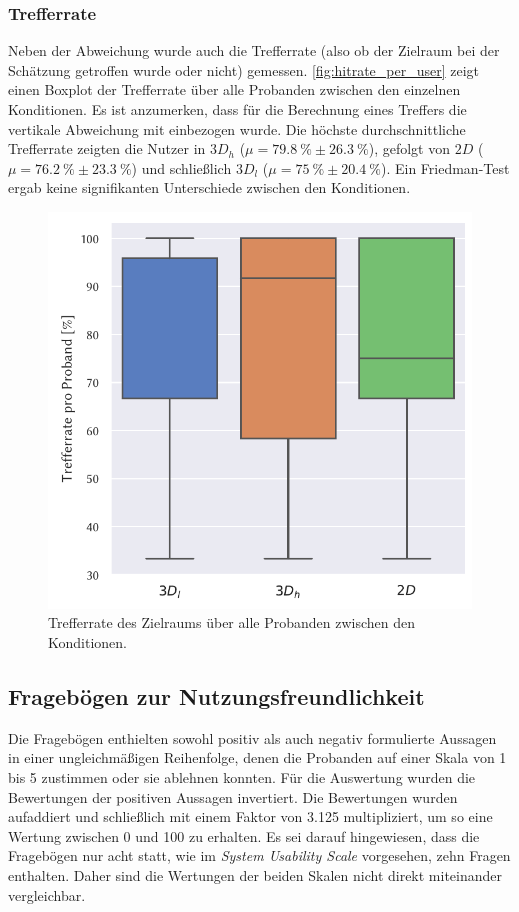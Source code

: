 \subsubsection*{Trefferrate}
Neben der Abweichung wurde auch die Trefferrate (also ob der Zielraum bei der Schätzung getroffen wurde oder nicht) gemessen.
\autoref{fig:hitrate_per_user} zeigt einen Boxplot der Trefferrate über alle Probanden zwischen den einzelnen Konditionen.
Es ist anzumerken, dass für die Berechnung eines Treffers die vertikale Abweichung mit einbezogen wurde.
Die höchste durchschnittliche Trefferrate zeigten die Nutzer in $3D_h$ ($\mu = \SI{79,8}{\percent} \pm \SI{26,3}{\percent}$), gefolgt von $2D$ ($\mu = \SI{76,2}{\percent} \pm \SI{23,3}{\percent}$) und schließlich $3D_l$ ($\mu = \SI{75}{\percent} \pm \SI{20,4}{\percent}$).
Ein Friedman-Test ergab keine signifikanten Unterschiede zwischen den Konditionen.
\begin{figure}[h]
    \centering
    \includegraphics[width=0.7\linewidth]{figures/analysis/hitrate_per_user}
    \caption{Trefferrate des Zielraums über alle Probanden zwischen den Konditionen.}
    \label{fig:hitrate_per_user}
\end{figure}

\subsection{Fragebögen zur Nutzungsfreundlichkeit}
Die Fragebögen enthielten sowohl positiv als auch negativ formulierte Aussagen in einer ungleichmäßigen Reihenfolge, denen die Probanden auf einer Skala von 1 bis 5 zustimmen oder sie ablehnen konnten.
Für die Auswertung wurden die Bewertungen der positiven Aussagen invertiert.
Die Bewertungen wurden aufaddiert und schließlich mit einem Faktor von \num{3,125} multipliziert, um so eine Wertung zwischen 0 und 100 zu erhalten.
Es sei darauf hingewiesen, dass die Fragebögen nur acht statt, wie im \emph{System Usability Scale} vorgesehen, zehn Fragen enthalten. 
Daher sind die Wertungen der beiden Skalen nicht direkt miteinander vergleichbar.

